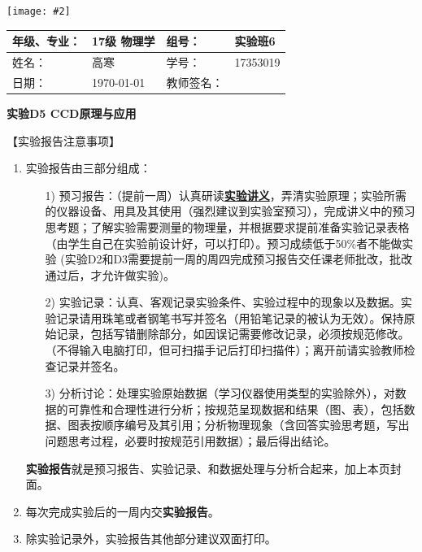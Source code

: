 \documentclass[11pt,a4paper]{ctexart}
\newcommand{\ExpeName}{实验D5 CCD原理与应用}
\newcommand{\cpic}[2]{
\begin{center}
\texttt{[image: \#2]}
\end{center}
}
\begin{document}
\cpic{0.255}{e1}%
\begin{table}[H]
\centering
\begin{tabular}{|p{32mm}|p{32mm}|p{32mm}|p{32mm}|}
\hline
年级、专业： & 17级 物理学 & 组号： & 实验班6 \\ \hline
姓名： & 高寒 & 学号： & 17353019 \\ \hline
日期： & \today & 教师签名： &  \\ \hline
\end{tabular}
\end{table}
\begin{center}
\LARGE\textbf{{\ExpeName}}
\end{center}
\large{【实验报告注意事项】}
\begin{enumerate}
 \item 实验报告由三部分组成：
 \begin{enumerate}
  \item[1)]预习报告：（提前一周）认真研读\textbf{\uline{实验讲义}}，弄清实验原理；实验所需的仪器设备、用具及其使用（强烈建议到实验室预习），完成讲义中的预习思考题；了解实验需要测量的物理量，并根据要求提前准备实验记录表格（由学生自己在实验前设计好，可以打印）。预习成绩低于50\%者不能做实验{\color{red} (实验D2和D3需要提前一周的周四完成预习报告交任课老师批改，批改通过后，才允许做实验)}。

  \item[2)]实验记录：认真、客观记录实验条件、实验过程中的现象以及数据。实验记录请用珠笔或者钢笔书写并签名（{\color{red}用铅笔记录的被认为无效}）。{\color{red}保持原始记录，包括写错删除部分，如因误记需要修改记录，必须按规范修改。}（不得输入电脑打印，但可扫描手记后打印扫描件）；离开前请实验教师检查记录并签名。
  \item[3)]分析讨论：处理实验原始数据（学习仪器使用类型的实验除外），对数据的可靠性和合理性进行分析；按规范呈现数据和结果（图、表），包括数据、图表按顺序编号及其引用；分析物理现象（含回答实验思考题，写出问题思考过程，必要时按规范引用数据）；最后得出结论。
 \end{enumerate}
 \textbf{实验报告}就是预习报告、实验记录、和数据处理与分析合起来，加上本页封面。
 \item 每次完成实验后的一周内交\textbf{实验报告}。
 \item 除实验记录外，实验报告其他部分建议双面打印。
\end{enumerate}
\ 
\\
\ 
\end{document}
